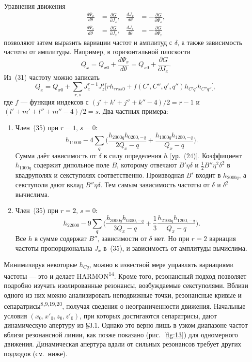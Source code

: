 \documentclass[11pt,a4paper]{article}
\begin{document}
Уравнения движения
\begin{equation}
\begin{aligned}
\frac{d\Psi_x}{d\theta}&=\frac{\partial G}{\partial J_x},&
\frac{dJ_x}{d\theta}&=-\frac{\partial G}{\partial\Psi_x},\\
\frac{d\Psi_z}{d\theta}&=\frac{\partial G}{\partial J_z},&
\frac{dJ_z}{d\theta}&=-\frac{\partial G}{\partial\Psi_z}
\end{aligned}
\end{equation}
позволяют затем выразить вариации частот и амплитуд с $\delta$, а также
зависимость частоты от амплитуды. Например, в горизонтальной плоскости
\begin{equation}
Q_x=Q_{x0}+\frac{d\Psi_x}{d\theta}=Q_{x0}+\frac{\partial G}{\partial J_x}.
\end{equation}
Из~(31) частоту можно записать
\begin{equation}
Q_x=Q_{x0}+\sum_{r,s}J_x^{r-1}J_z^{s}
\bigl[r h_{rrss0}+f(C',C'',q',q'')h_{C'q'}h_{C''q''}\bigr],
\end{equation}
где $f$ --- функция индексов с $(j'+k'+j''+k''-4)/2=r-1$ и
$(l'+m'+l''+m''-4)/2=s$. Два частных примера:

\begin{enumerate}
\item[(i)] Член~(35) при $r=1$, $s=0$:
\begin{equation}
h_{11000}-4\sum_q\Biggl(
\frac{h_{2000q}h_{0200,-q}}{2Q_x-q}
+\frac{h_{1000q}h_{1200,-q}}{Q_x-q}\Biggr).
\end{equation}
Сумма даёт зависимость от $\delta$ в силу определения $h$ [ур.~(24)].
Коэффициент $h_{1000q}$ содержит дипольное поле $B$, которому отвечают
$B'\eta\delta$ и $\tfrac12 B''\eta^2\delta^2$ в квадруполях и секступолях
соответственно. Производная $B'$ входит в $h_{2000q}$, а секступоли дают вклад
$B''\eta\delta$. Тем самым зависимость частоты от $\delta$ и $\delta^2$
вычислима.

\item[(ii)] Член~(35) при $r=2$, $s=0$:
\begin{equation}
h_{22000}-9\sum_q\Biggl(
\frac{h_{3000q}h_{0300,-q}}{3Q_x-q}
+\frac13\frac{h_{2100q}h_{1200,-q}}{Q_x-q}\Biggr).
\end{equation}
Все $h$ в сумме содержат $B''$, зависимости от $\delta$ нет. Но при $r=2$
вариация частоты пропорциональна $J_x$ в~(35), и зависимость от амплитуды
вычислима.
\end{enumerate}

Минимизируя некоторые $h_{Cq}$, можно в известной мере управлять вариациями
частоты --- это и делает HARMON\textsuperscript{14}. Кроме того, резонансный
подход позволяет подробно изучать изолированные резонансы, возбуждаемые
секступолями. Вблизи одного из них можно анализировать неподвижные точки,
резонансные кривые и сепаратрисы\textsuperscript{8,9,19,20}, получая сведения о
неограниченности движения. Начальные условия $(x_0,x'_0,z_0,z'_0)$, при которых
достигаются сепаратрисы, дают динамическую апертуру из §3.1. Однако это верно
лишь в узком диапазоне частот вблизи резонансной линии, как позже показано
(рис.~\ref{fig:13}) для одномерного движения. Динамическая апертура вдали от
сильных резонансов требует других подходов (см.\ ниже).
\end{document}
